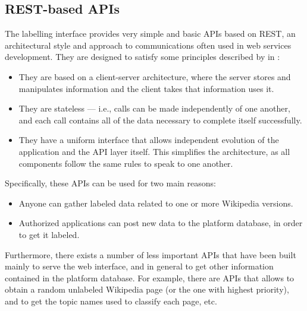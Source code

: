         \subsection{REST-based APIs}\label{rest_api}
            The labelling interface provides very simple and basic APIs based on REST, an architectural style and approach to communications often used in web services development. They are designed to satisfy some principles described by \citeauthor{Fielding} in \cite{Fielding}:
            \begin{itemize}
                \item They are based on a client-server architecture, where the server stores and manipulates information and the client takes that information uses it.
                \item They are stateless --- i.e., calls can be made independently of one another, and each call contains all of the data necessary to complete itself successfully.
                \item They have a uniform interface that allows independent evolution of the application and the API layer itself. This simplifies the architecture, as all components follow the same rules to speak to one another.
            \end{itemize}
            
            Specifically, these APIs can be used for two main reasons:
            \begin{itemize}
                \item Anyone can gather labeled data related to one or more Wikipedia versions.
                \item Authorized applications can post new data to the platform database, in order to get it labeled.
            \end{itemize}
            Furthermore, there exists a number of less important APIs that have been built mainly to serve the web interface, and in general to get other information contained in the platform database. For example, there are APIs that allows to obtain a random unlabeled Wikipedia page (or the one with highest priority), and to get the topic names used to classify each page, etc.
            
